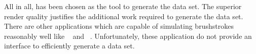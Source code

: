 All in all,  has been chosen as the tool to generate the data set.
The superior render quality justifies the additional work required to generate the data set.\\
There are other applications which are capable of simulating brushstrokes reasonably well like ~\cite{artrage} and ~\cite{krita}.
Unfortunately, these application do not provide an interface to efficiently generate a data set.
\begin{marginfigure}
    \qquad
\end{marginfigure}

